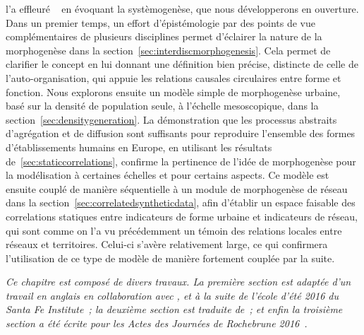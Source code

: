 l'a effleuré ~\cite{durand2003geographes} en évoquant la systèmogenèse, que nous développerons en ouverture. Dans un premier temps, un effort d'épistémologie par des points de vue complémentaires de plusieurs disciplines permet d'éclairer la nature de la morphogenèse dans la section~\ref{sec:interdiscmorphogenesis}. Cela permet de clarifier le concept en lui donnant une définition bien précise, distincte de celle de l'auto-organisation, qui appuie les relations causales circulaires entre forme et fonction. Nous explorons ensuite un modèle simple de morphogenèse urbaine, basé sur la densité de population seule, à l'échelle mesoscopique, dans la section~\ref{sec:densitygeneration}. La démonstration que les processus abstraits d'agrégation et de diffusion sont suffisants pour reproduire l'ensemble des formes d'établissements humains en Europe, en utilisant les résultats de~\ref{sec:staticcorrelations}, confirme la pertinence de l'idée de morphogenèse pour la modélisation à certaines échelles et pour certains aspects. Ce modèle est ensuite couplé de manière séquentielle à un module de morphogenèse de réseau dans la section~\ref{sec:correlatedsyntheticdata}, afin d'établir un espace faisable des correlations statiques entre indicateurs de forme urbaine et indicateurs de réseau, qui sont comme on l'a vu précédemment un témoin des relations locales entre réseaux et territoires. Celui-ci s'avère relativement large, ce qui confirmera l'utilisation de ce type de modèle de manière fortement couplée par la suite.




\stars


\textit{Ce chapitre est composé de divers travaux. La première section est adaptée d'un travail en anglais en collaboration avec ,  et  à la suite de l'école d'été 2016 du Santa Fe Institute~\cite{antelope2016interdisciplinary}; la deuxième section est traduite de~\cite{}; et enfin la troisième section a été écrite pour les Actes des Journées de Rochebrune 2016~\cite{raimbault2016generation}.}














